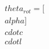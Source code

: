 \documentclass[preview]{standalone}
\begin{document}
\begin{align*}
\quad\\theta_{rot} = [\quad\\alpha] \quad\\cdot c \quad\\cdot l
\end{align*}
\end{document}
